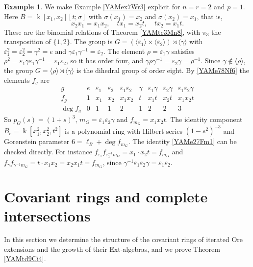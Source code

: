 \documentclass[reqno]{amsart}
\numberwithin{equation}{section}
\theoremstyle{definition}
\newtheorem{example}[equation]{Example}
\theoremstyle{remark}
\theoremstyle{plain}
\newcommand{\kk}{\Bbbk}
\begin{document}
\begin{example}\label{YAMex13Dt6}
We make Example \ref{YAMex7Wr3} explicit for $n=r=2$ and $p=1$. Here $B=\kk[x_1,x_2][t;\sigma]$ with $\sigma(x_1)=x_2$ and $\sigma(x_2)=x_1$, that is,
\begin{equation}\label{YAMe66Wr9}
x_2x_1=x_1x_2,\quad tx_1=x_2t,\quad tx_2=x_1t.
\end{equation}
These are the binomial relations of Theorem \ref{YAMtc3Mn8}, with $\pi_3$ the transposition of $\{1,2\}$. The group is $G=(\langle\varepsilon_1\rangle\times\langle\varepsilon_2\rangle)\rtimes\langle\gamma\rangle$ with $\varepsilon_1^2=\varepsilon_2^2=\gamma^2=e$ and $\gamma\varepsilon_1\gamma^{-1}=\varepsilon_2$. The element $\rho=\varepsilon_1\gamma$ satisfies $\rho^2=\varepsilon_1\gamma\varepsilon_1\gamma^{-1}=\varepsilon_1\varepsilon_2$, so it has order four, and $\gamma\rho\gamma^{-1}=\varepsilon_2\gamma=\rho^{-1}$. Since $\gamma\notin\langle\rho\rangle$, the group $G=\langle\rho\rangle\rtimes\langle\gamma\rangle$ is the dihedral group of order eight. By \eqref{YAMe78Nf6} the elements $f_g$ are
\[
\begin{array}{c|cccccccc}
g&e&\varepsilon_1&\varepsilon_2&\varepsilon_1\varepsilon_2&\gamma&\varepsilon_1\gamma&\varepsilon_2\gamma&\varepsilon_1\varepsilon_2\gamma\\\hline
f_g&1&x_1&x_2&x_1x_2&t&x_1t&x_2t&x_1x_2t\\
\deg f_g&0&1&1&2&1&2&2&3
\end{array}
\]
So $p_G(s)=(1+s)^3$, $m_G=\varepsilon_1\varepsilon_2\gamma$ and $f_{m_G}=x_1x_2t$. The identity component $B_e=\kk[x_1^2,x_2^2,t^2]$ is a polynomial ring with Hilbert series $(1-s^2)^{-3}$ and Gorenstein parameter $6=\ell_B+\deg f_{m_G}$. The identity \eqref{YAMe27Fm1} can be checked directly. For instance $f_{\varepsilon_1}f_{\varepsilon_1^{-1}m_G}=x_1\cdot x_2t=f_{m_G}$ and $f_\gamma f_{\gamma^{-1}m_G}=t\cdot x_1x_2=x_2x_1t=f_{m_G}$, since $\gamma^{-1}\varepsilon_1\varepsilon_2\gamma=\varepsilon_1\varepsilon_2$.
\end{example}


\section{Covariant rings and complete intersections}\label{YAMs6Cv0}

In this section we determine the structure of the covariant rings of iterated Ore extensions and the growth of their Ext-algebras, and we prove Theorem \ref{YAMtd9Ci4}.
\end{document}

